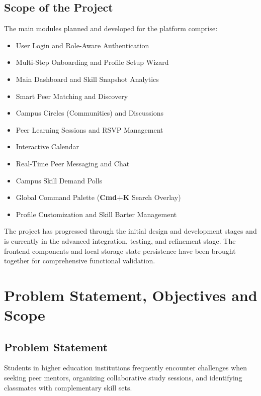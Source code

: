 \documentclass[12pt,a4paper]{report}
\begin{document}
\section{Scope of the Project}
The main modules planned and developed for the platform comprise:
\begin{itemize}
    \setlength{\itemsep}{1.5pt}
    \setlength{\parskip}{0pt}
    \item User Login and Role-Aware Authentication
    \item Multi-Step Onboarding and Profile Setup Wizard
    \item Main Dashboard and Skill Snapshot Analytics
    \item Smart Peer Matching and Discovery
    \item Campus Circles (Communities) and Discussions
    \item Peer Learning Sessions and RSVP Management
    \item Interactive Calendar
    \item Real-Time Peer Messaging and Chat
    \item Campus Skill Demand Polls
    \item Global Command Palette (\textbf{Cmd+K} Search Overlay)
    \item Profile Customization and Skill Barter Management
\end{itemize}

The project has progressed through the initial design and development stages and is currently in the advanced integration, testing, and refinement stage. The frontend components and local storage state persistence have been brought together for comprehensive functional validation.

\newpage
\chapter{Problem Statement, Objectives and Scope}

\section{Problem Statement}
Students in higher education institutions frequently encounter challenges when seeking peer mentors, organizing collaborative study sessions, and identifying classmates with complementary skill sets.
\end{document}
